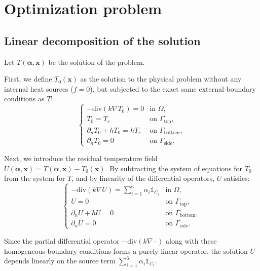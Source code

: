 \section{Optimization problem}\label{sec:opti_pb}

\subsection{Linear decomposition of the solution}

Let $T(\boldsymbol{\alpha}, \mathbf{x})$ be the solution of the problem.

First, we define $T_0(\mathbf{x})$ as the solution to the physical problem without any internal heat sources ($f = 0$), but subjected to the exact same external boundary conditions as $T$:
\begin{equation} \label{eq:T0}
    \begin{cases}
        -\mathrm{div}(k\nabla T_0) = 0 & \text{in } \Omega, \\
        T_0 = T_c & \text{on } \Gamma_{\text{top}}, \\
        \partial_n T_0 + h T_0 = h T_e & \text{on } \Gamma_{\text{bottom}}, \\
        \partial_n T_0 = 0 & \text{on } \Gamma_{\text{side}}.
    \end{cases}
\end{equation}

Next, we introduce the residual temperature field $U(\boldsymbol{\alpha}, \mathbf{x}) = T(\boldsymbol{\alpha}, \mathbf{x}) - T_0(\mathbf{x})$. By subtracting the system of equations for $T_0$ from the system for $T$, and by linearity of the differential operators, $U$ satisfies:
\begin{equation} \label{eq:global_U}
    \begin{cases}
        -\mathrm{div}(k\nabla U) = \sum_{i=1}^6 \alpha_i \mathbb{1}_{C_i} & \text{in } \Omega, \\
        U = 0 & \text{on } \Gamma_{\text{top}}, \\
        \partial_n U + h U = 0 & \text{on } \Gamma_{\text{bottom}}, \\
        \partial_n U = 0 & \text{on } \Gamma_{\text{side}}.
    \end{cases}
\end{equation}

Since the partial differential operator $-\mathrm{div}(k\nabla \cdot)$ along with these homogeneous boundary conditions forms a purely linear operator, the solution $U$ depends linearly on the source term $\sum_{i=1}^6 \alpha_i \mathbb{1}_{C_i}$.

